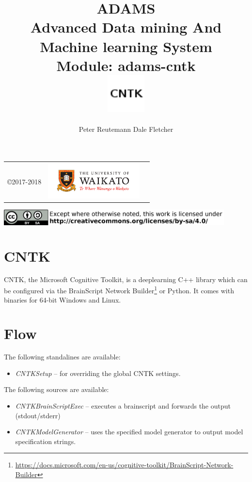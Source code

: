 \documentclass[a4paper]{book}
\title{
  \textbf{ADAMS} \\
  {\Large \textbf{A}dvanced \textbf{D}ata mining \textbf{A}nd \textbf{M}achine
  learning \textbf{S}ystem} \\
  {\Large Module: adams-cntk} \\
  \vspace{1cm}
  \includegraphics[width=2cm]{images/cntk-module.png} \\
}
\author{
  Peter Reutemann
  Dale Fletcher
}
\begin{document}
\begin{titlepage}
\maketitle

\thispagestyle{empty}
\center
\begin{table}[b]
	\begin{tabular}{c l l}
		\parbox[c][2cm]{2cm}{\copyright 2017-2018} &
		\parbox[c][2cm]{5cm}{\includegraphics[width=5cm]{images/coat_of_arms.pdf}} \\
	\end{tabular}
	\includegraphics[width=12cm]{images/cc.png} \\
\end{table}

\end{titlepage}

\tableofcontents

\chapter{CNTK}
CNTK, the Microsoft Cognitive Toolkit\cite{cntk}, is a deeplearning C++
library which can be configured via the BrainScript Network
Builder\footnote{\url{https://docs.microsoft.com/en-us/cognitive-toolkit/BrainScript-Network-Builder}{}}
or Python. It comes with binaries for 64-bit Windows and Linux.


\chapter{Flow}
The following standalines are available:
\begin{itemize}
  \item \textit{CNTKSetup} -- for overriding the global CNTK settings.
\end{itemize}
The following sources are available:
\begin{itemize}
  \item \textit{CNTKBrainScriptExec} -- executes a brainscript and forwards the output (stdout/stderr)
  \item \textit{CNTKModelGenerator} -- uses the specified model generator
  to output model specification strings.
\end{itemize}
\end{document}
